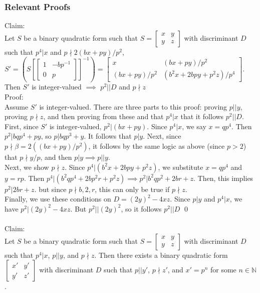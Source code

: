 \documentclass[11pt, oneside]{amsart}
\begin{document}
\subsubsection{Relevant Proofs}
Claim:
\\
Let $S$ be a binary quadratic form such that $S=
\begin{bmatrix}
x &	y \\
y & z
\end{bmatrix}$ with discriminant $D$ 
\\
such that $p^4\vert x$ and $p\nmid 2(bx+py)/p^2$, $S'=(S[
\begin{bmatrix}
1 &	-bp^{-1} \\
0 & p
\end{bmatrix}
]^{-1})=\begin{bmatrix}
x &	(bx +py)/p^2 \\
(bx+py)/p^2 & (b^2x+2bpy+p^2z)/p^4
\end{bmatrix}$. Then $S'$ is integer-valued $\implies$ $p^2\vert\vert D$ and $p\nmid z$
\\
Proof:
\\
Assume $S'$ is integer-valued. There are three parts to this proof: proving $p\vert\vert y$, proving $ p\nmid z$, and then proving from these and that $p^4\vert x$ that it follows $p^2\vert\vert D$. First, since $S'$ is integer-valued, $p^2\vert (bx+py)$. Since $p^4\vert x$, we say $x=qp^4$. Then $p^2\vert bqp^4+py$, so $p\vert bqp^3+y$. It follows that $p\vert y$. Next, since $p\nmid \beta=2((bx+py)/p^2)$, it follows by the same logic as above (since $p>2$) that $p\nmid y/p$, and then $p\vert y \implies p\vert\vert y$.
\\
Next, we show $p\nmid z$. Since $p^4\vert (b^2x+2bpy+p^2z)$, we substitute $x=qp^4$ and $y=rp$. Then $p^4\vert (b^2qp^4+2bp^2r+p^2z) \implies p^2\vert b^2qp^2+2br+z$.  Then, this implies $p^2\vert 2br+z$. but since $p\nmid b, 2, r$, this can only be true if $p\nmid z$.
\\
Finally, we use these conditions on $D=(2y)^2-4xz$. Since $p\vert y$ and $p^4\vert x$, we have $p^2\vert (2y)^2-4xz$. But $p^2\vert\vert (2y)^2$, so it follows $p^2\vert\vert D$ \qed
\\
\\
Claim:
\\
Let $S$ be a binary quadratic form such that $S=
\begin{bmatrix}
x &	y \\
y & z
\end{bmatrix}$ with discriminant $D$ such that $p^4\vert x$, $p\vert \vert y$, and $p\nmid z$. Then there exists a binary quadratic form $\begin{bmatrix}
x' & y' \\
y' & z'
\end{bmatrix}$ with discriminant $D$ such that $p\vert \vert y'$, $p\nmid z'$, and $x'=p^n$ for some $n\in \mathbb{N}$.
\end{document}
